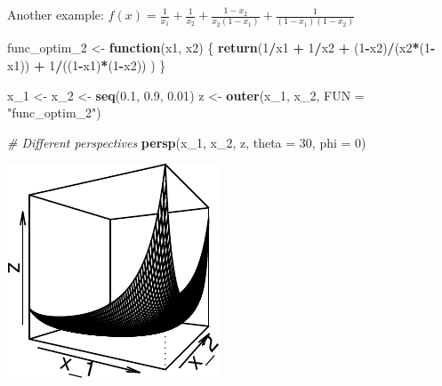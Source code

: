 \documentclass[11pt,]{article}
\newenvironment{Shaded}{\begin{snugshade}}{\end{snugshade}}
\newcommand{\KeywordTok}[1]{\textcolor[rgb]{0.13,0.29,0.53}{\textbf{#1}}}
\newcommand{\DataTypeTok}[1]{\textcolor[rgb]{0.13,0.29,0.53}{#1}}
\newcommand{\DecValTok}[1]{\textcolor[rgb]{0.00,0.00,0.81}{#1}}
\newcommand{\FloatTok}[1]{\textcolor[rgb]{0.00,0.00,0.81}{#1}}
\newcommand{\StringTok}[1]{\textcolor[rgb]{0.31,0.60,0.02}{#1}}
\newcommand{\CommentTok}[1]{\textcolor[rgb]{0.56,0.35,0.01}{\textit{#1}}}
\newcommand{\ControlFlowTok}[1]{\textcolor[rgb]{0.13,0.29,0.53}{\textbf{#1}}}
\newcommand{\OperatorTok}[1]{\textcolor[rgb]{0.81,0.36,0.00}{\textbf{#1}}}
\newcommand{\NormalTok}[1]{#1}
\begin{document}
Another example:
\(f(x) = \frac{1}{x_1}+\frac{1}{x_2}+\frac{1-x_2}{x_2(1-x_1)}+\frac{1}{(1-x_1)(1-x_2)}\)

\begin{Shaded}
\begin{Highlighting}[]
\NormalTok{func_optim_}\DecValTok{2}\NormalTok{ <-}\StringTok{ }\ControlFlowTok{function}\NormalTok{(x1, x2) }
\NormalTok{\{}
  \KeywordTok{return}\NormalTok{(}\DecValTok{1}\OperatorTok{/}\NormalTok{x1 }\OperatorTok{+}\StringTok{ }\DecValTok{1}\OperatorTok{/}\NormalTok{x2 }\OperatorTok{+}\StringTok{ }
\StringTok{    }\NormalTok{(}\DecValTok{1}\OperatorTok{-}\NormalTok{x2)}\OperatorTok{/}\NormalTok{(x2}\OperatorTok{*}\NormalTok{(}\DecValTok{1}\OperatorTok{-}\NormalTok{x1)) }\OperatorTok{+}\StringTok{ }
\StringTok{    }\DecValTok{1}\OperatorTok{/}\NormalTok{((}\DecValTok{1}\OperatorTok{-}\NormalTok{x1)}\OperatorTok{*}\NormalTok{(}\DecValTok{1}\OperatorTok{-}\NormalTok{x2))}
\NormalTok{    )}
\NormalTok{\}}

\NormalTok{x_}\DecValTok{1}\NormalTok{ <-}\StringTok{ }\NormalTok{x_}\DecValTok{2}\NormalTok{ <-}\StringTok{ }\KeywordTok{seq}\NormalTok{(}\FloatTok{0.1}\NormalTok{, }\FloatTok{0.9}\NormalTok{, }\FloatTok{0.01}\NormalTok{)}
\NormalTok{z <-}\StringTok{ }\KeywordTok{outer}\NormalTok{(x_}\DecValTok{1}\NormalTok{, x_}\DecValTok{2}\NormalTok{, }\DataTypeTok{FUN =} \StringTok{"func_optim_2"}\NormalTok{)}

\CommentTok{# Different perspectives}
\KeywordTok{persp}\NormalTok{(x_}\DecValTok{1}\NormalTok{, x_}\DecValTok{2}\NormalTok{, z, }\DataTypeTok{theta =} \DecValTok{30}\NormalTok{, }\DataTypeTok{phi =} \DecValTok{0}\NormalTok{) }
\end{Highlighting}
\end{Shaded}

\begin{center}\includegraphics{Optimization_files/figure-latex/opt_unconstr_optim_2-1} \end{center}
\end{document}
